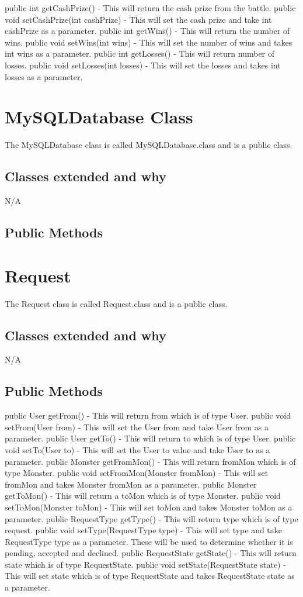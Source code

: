 \documentclass{project}
\begin{document}
public int getCashPrize() - This will return the cash prize from the battle. public void setCashPrize(int cashPrize) - This will set the cash prize and take int cashPrize as a parameter.
public int getWins() - This will return the number of wins. public void setWins(int wins) - This will set the number of wins and takes int wins as a parameter.
public int getLosses() - This will return number of losses. public void setLosses(int losses) - This will set the losses and takes int losses as a parameter.

\section{MySQLDatabase Class}
The MySQLDatabase class is called MySQLDatabase.class and is a public class.
\subsection{Classes extended and why}
N/A
\subsection{Public Methods}


\section{Request}
The Request class is called Request.class and is a public class.
\subsection{Classes extended and why}
N/A
\subsection{Public Methods}
public User getFrom() - This will return from which is of type User. public void setFrom(User from) - This will set the User from and take User from as a parameter.
public User getTo() - This will return to which is of type User. public void setTo(User to) - This will set the User to value and take User to as a parameter.
public Monster getFromMon() - This will return fromMon which is of type Monster. public void setFromMon(Monster fromMon) - This will set fromMon and takes Monster fromMon as a parameter.
public Monster getToMon() - This will return a toMon which is of type Monster. public void setToMon(Monster toMon) - This will set toMon and takes Monster toMon as a parameter.
public RequestType getType() - This will return type which is of type request. public void setType(RequestType type) - This will set type and take RequestType type as a parameter. These will be used to determine whether it is pending, accepted and declined.
public RequestState getState() - This will return state which is of type RequestState. public void setState(RequestState state) - This will set state which is of type RequestState and takes RequestState state as a parameter.
\end{document}
